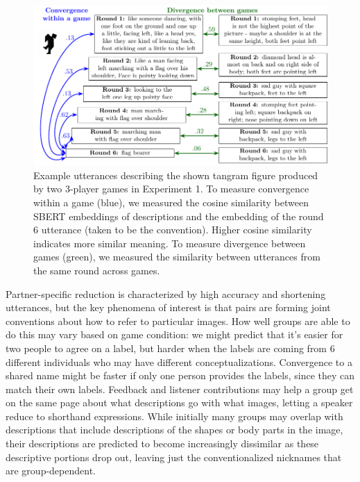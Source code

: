 \documentclass[
  english,
  a4paper,
]{article}
\begin{document}
\begin{figure}[t!]

{\centering \includegraphics[width=1\linewidth]{sbert} 

}

\caption{Example utterances describing the shown tangram figure produced by two 3-player games in Experiment 1. To measure convergence within a game (blue), we measured the cosine similarity between SBERT embeddings of descriptions and the embedding of the round 6 utterance (taken to be the convention). Higher cosine similarity indicates more similar meaning. To measure divergence between games (green), we measured the similarity between utterances from the same round across games.}\label{fig:sbert-diagram}
\end{figure}

Partner-specific reduction is characterized by high accuracy and shortening utterances, but the key phenomena of interest is that pairs are forming joint conventions about how to refer to particular images. How well groups are able to do this may vary based on game condition: we might predict that it's easier for two people to agree on a label, but harder when the labels are coming from 6 different individuals who may have different conceptualizations. Convergence to a shared name might be faster if only one person provides the labels, since they can match their own labels. Feedback and listener contributions may help a group get on the same page about what descriptions go with what images, letting a speaker reduce to shorthand expressions. While initially many groups may overlap with descriptions that include descriptions of the shapes or body parts in the image, their descriptions are predicted to become increasingly dissimilar as these descriptive portions drop out, leaving just the conventionalized nicknames that are group-dependent.
\end{document}
